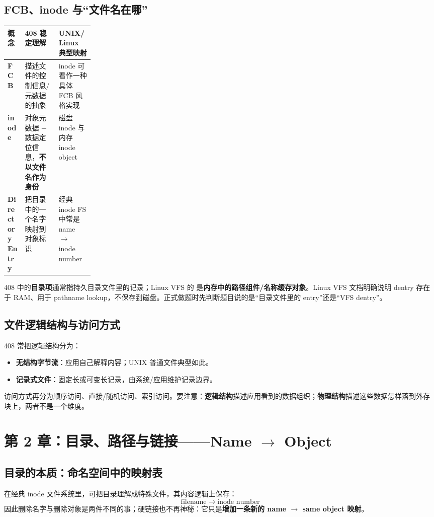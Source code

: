 \documentclass[11pt,a4paper]{ctexart}
\newcommand{\kw}[1]{\textbf{#1}}
\newcommand{\code}[1]{\texttt{\detokenize{#1}}}
\newcommand{\arr}{\;\longrightarrow\;}
\begin{document}
\subsection{FCB、inode 与“文件名在哪”}
\begin{center}
\small
\begin{tabularx}{\linewidth}{>{\bfseries}p{0.20\linewidth} X X}
\toprule
概念 & 408 稳定理解 & UNIX/Linux 典型映射 \\
\midrule
FCB & 描述文件的控制信息/元数据的抽象 & inode 可看作一种具体 FCB 风格实现 \\
inode & 对象元数据 + 数据定位信息，\kw{不以文件名作为身份} & 磁盘 inode 与内存 inode object \\
Directory Entry & 把目录中的一个名字映射到对象标识 & 经典 inode FS 中常是 name $\to$ inode number \\
\bottomrule
\end{tabularx}
\end{center}

\begin{warn}
408 中的\kw{目录项}通常指持久目录文件里的记录；Linux VFS 的 \code{struct dentry} 是\kw{内存中的路径组件/名称缓存对象}。Linux VFS 文档明确说明 dentry 存在于 RAM、用于 pathname lookup，不保存到磁盘。正式做题时先判断题目说的是“目录文件里的 entry”还是“VFS dentry”。
\end{warn}

\subsection{文件逻辑结构与访问方式}
408 常把逻辑结构分为：
\begin{itemize}
  \item \kw{无结构字节流}：应用自己解释内容；UNIX 普通文件典型如此。
  \item \kw{记录式文件}：固定长或可变长记录，由系统/应用维护记录边界。
\end{itemize}
访问方式再分为顺序访问、直接/随机访问、索引访问。要注意：\kw{逻辑结构}描述应用看到的数据组织；\kw{物理结构}描述这些数据怎样落到外存块上，两者不是一个维度。

\section{第 2 章：目录、路径与链接——Name $\to$ Object}

\subsection{目录的本质：命名空间中的映射表}
在经典 inode 文件系统里，可把目录理解成特殊文件，其内容逻辑上保存：
\[
\boxed{\text{filename}\arr\text{inode number}}
\]
因此删除名字与删除对象是两件不同的事；硬链接也不再神秘：它只是\kw{增加一条新的 name $\to$ same object 映射}。
\end{document}
